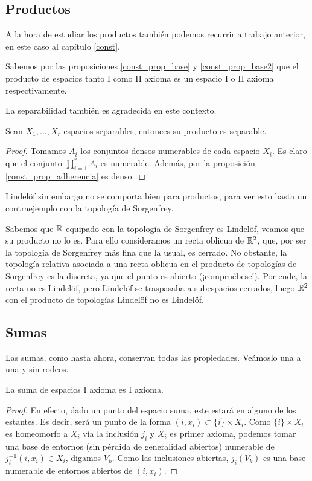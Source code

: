 \subsection{Productos}
A la hora de estudiar los productos también podemos recurrir a trabajo anterior, en este caso al capítulo \ref{const}.
\begin{obs}
	Sabemos por las proposiciones \ref{const_prop_base} y \ref{const_prop_base2} que el producto de espacios tanto I como II axioma es un espacio I o II axioma respectivamente.
\end{obs}
La separabilidad también es agradecida en este contexto.
\begin{lem}
	Sean $X_1,\dots,X_r$ espacios separables, entonces su producto es separable.
\end{lem}
\begin{proof}
	Tomamos $A_i$ los conjuntos densos numerables de cada espacio $X_i$. Es claro que el conjunto $\prod_{i=1}^rA_i$ es numerable. Además, por la proposición \ref{const_prop_adherencia} es denso.
\end{proof}
Lindelöf sin embargo no se comporta bien para productos, para ver esto basta un contraejemplo con la topología de Sorgenfrey.
\begin{exa}
	Sabemos que $\mathbb{R}$ equipado con la topología de Sorgenfrey es Lindelöf, veamos que su producto no lo es. Para ello consideramos un recta oblicua de $\mathbb{R}^2$, que, por ser la topología de Sorgenfrey más fina que la usual, es cerrado. No obstante, la topología relativa asociada a una recta oblicua en el producto de topologías de Sorgenfrey es la discreta, ya que el punto es abierto (¡compruébese!). Por ende, la recta no es Lindelöf, pero Lindelöf se traspasaba a subespacios cerrados, luego $\mathbb{R}^2$ con el producto de topologías Lindelöf no es Lindelöf.
\end{exa}
\subsection{Sumas}
Las sumas, como hasta ahora, conservan todas las propiedades. Veámoslo una a una y sin rodeos.
\begin{lem}
	La suma de espacios I axioma es I axioma.
\end{lem}
\begin{proof}
	En efecto, dado un punto del espacio suma, este estará en alguno de los estantes. Es decir, será un punto de la forma $(i,x_i)\subset\{i\}\times X_i$. Como $\{i\}\times X_i$ es homeomorfo a $X_i$ vía la inclusión $j_i$ y $X_i$ es primer axioma, podemos tomar una base de entornos (sin pérdida de generalidad abiertos) numerable  de $j_i^{-1}(i,x_i)\in X_i$, digamos $V_k$. Como las inclusiones abiertas, $j_i(V_k)$ es una base numerable de entornos abiertos de $(i,x_i)$.
\end{proof}

